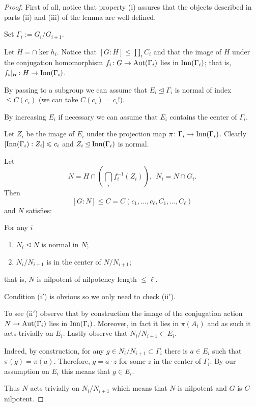 \documentclass{amsart}
\begin{document}
\begin{proof}
First of all, notice that
property (i) assures that the
objects described in parts (ii) and (iii) of the lemma are well-defined.

Set $\Gamma_i:=G_i/G_{i+1}$.

Let $H=\cap\ker{h_i}$.
Notice that $[G{:}H]\le \prod_iC_i$ and that the image of $H$ under the conjugation homomorphism $f_i\colon  G\to \operatorname{\rm Aut}(\Gamma_i)$  lies in $\operatorname{\rm Inn}(\Gamma_i)$;
that is,  $f_i|_H\colon H\z\to\Inn(\Gamma_i)$.

By passing to a subgroup we can assume that $E_i\unlhd \Gamma_i$ is normal of index $\le C(c_i)$ (we can take $C(c_i)=c_i!$).

By increasing $E_i$ if necessary we can assume that $E_i$ contains the center of $\Gamma_i$.

Let $Z_i$ be the image of $E_i$ under the projection map $\pi\colon \Gamma_i\to \operatorname{\rm Inn}(\Gamma_i)$.
Clearly $[ \operatorname{\rm Inn}(\Gamma_i): Z_i]\leqslant c_i$ and $Z_i\unlhd  \operatorname{\rm Inn}(\Gamma_i)$ is normal.


Let
$$N=H\cap\left(\bigcap_if_i^{-1}(Z_i)\right),\ \  N_i=N\cap G_i.$$
Then
$$[G:N]\le C=C(c_1,\ldots, c_\ell, C_1,\ldots, C_\ell)$$
and $N$ satisfies:


For any $i$
\begin{enumerate}[(i$'$)]
\item$N_i \unlhd N$ is normal in $N$;

\item $N_i/N_{i+1}$ is in the center of $N/N_{i+1}$;
\end{enumerate}
 that is, $N$ is nilpotent of nilpotency length $\le \ell$.

 Condition (i$'$) is obvious so we only need to check (ii$'$).

 To see (ii$'$) observe that by construction the image of the conjugation action $N\to \operatorname{\rm Aut}(\Gamma_i)$ lies in $\operatorname{\rm Inn}(\Gamma_i)$. Moreover, in fact it lies in $\pi(A_i)$ and as such it acts trivially on $E_i$. Lastly observe that  $N_i/N_{i+1}\subset E_i$.

 Indeed, by construction, for any $g\in N_i/N_{i+1}\subset \Gamma_i$ there is $a\in E_i$ such that $\pi(g)=\pi(a)$. Therefore, $g=a\cdot z$ for some $z$ in the center of $\Gamma_i$. By our assumption on $E_i$ this means that $g\in E_i$.

 Thus $N$ acts trivially on $N_i/N_{i+1}$ which means that $N$ is nilpotent and $G$ is $C$-nilpotent.
 \end{proof}
\end{document}
